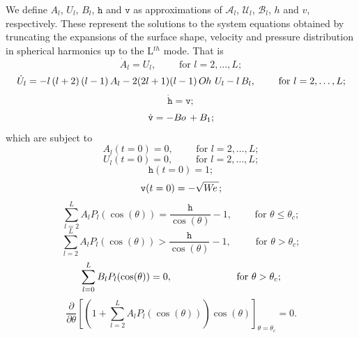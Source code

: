 \documentclass{jfm}
\newcommand{\aproxsol}[1]{\mathtt{#1}}
\newcommand{\We}{W\kern-0.15em e\,}
\newcommand{\Bo}{B\kern-0.05em o\,}
\newcommand{\Oh}{O\kern-0.05em h\,}
\begin{document}
We define $A_l$, $U_l$, $B_l$, $\aproxsol{h}$ and $\aproxsol{v}$ as approximations of 
$\mathscr{A}_l$, $\mathscr{U}_l$, $\mathscr{B}_l$, $h$ and $v$, respectively. These represent the solutions to the system equations obtained by truncating the expansions of the surface shape, velocity and pressure distribution in spherical harmonics up to the L$^{th}$ mode. That is
\begin{equation}\label{eqn:nd_dot_A_l_v01}
    \dot{A}_l = U_l, \qquad \text{ for } l = 2,\ldots,L;
\end{equation}
\begin{equation}\label{eqn:nd_dot_U_l_v01}
    \dot{U}_l 
    =
    -l \left(l+2\right)\left(l-1\right)A_l -2(2l+1)(l-1)\,  \Oh \, {U}_l
    -l \, B_l, \qquad \text{ for } l = 2,\ldots, L;
\end{equation}
\begin{equation}\label{eqn:nd_dot_h_v}
    \dot{\aproxsol{h}} = \aproxsol{v};
\end{equation}
\begin{equation} \label{eqn:nd_dot_v}
    \dot{\aproxsol{v}} = - \Bo + B_1;
\end{equation}
which are subject to 
\begin{equation}
    A_l(t=0) = 0, \qquad \text{ for } l = 2,\ldots, L;
\end{equation}
\begin{equation}
    U_l(t=0) = 0, \qquad \text{ for } l = 2,\ldots, L;
\end{equation}
\begin{equation}
    \aproxsol{h}(t=0) = 1;
\end{equation}
\begin{equation}
    \aproxsol{v}(t=0) = -\sqrt{\We};
\end{equation}
\begin{equation}
    \sum\limits_{l=2}^{L} {A_lP_l\left(\cos(\theta)\right)} = \frac{\aproxsol{h}}{\cos(\theta)}-1, \qquad \text{ for } \theta \leq \theta_c;
\end{equation}
\begin{equation}
    \sum\limits_{l=2}^L {A_lP_l(\cos(\theta))} > \frac{\aproxsol{h}}{\cos(\theta)}-1, \qquad \, \text{ for } \theta > \theta_c;
\end{equation}
\begin{equation}
    \sum\limits_{l=0}^{L} {B_lP_l(\cos(\theta))} = 0, \qquad \hspace{15 mm} \text{ for } \theta > \theta_c;
\end{equation}
\begin{equation}
    \frac{\partial}{\partial \theta}\left[\left(1+\sum\limits_{l=2}^L {A_lP_l(\cos(\theta))}\right)\cos(\theta)\right]_{\theta=\theta_c} = 0.
\end{equation}
\end{document}
